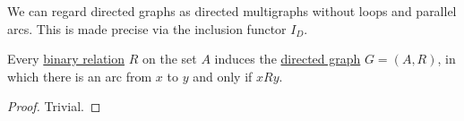 \begin{comments}
  \item We can regard directed graphs as directed multigraphs without loops and parallel arcs. This is made precise via the inclusion functor \hyperref[def:graph_functors/directed_inclusion]{\( I_D \)}.
\end{comments}

\begin{proposition}\label{def:directed_graph_induced_by_relation}
  Every \hyperref[def:binary_relation]{binary relation} \( R \) on the set \( A \) induces the \hyperref[def:directed_graph]{directed graph} \( G = (A, R) \), in which there is an arc from \( x \) to \( y \) and only if \( x R y \).
\end{proposition}
\begin{proof}
  Trivial.
\end{proof}

